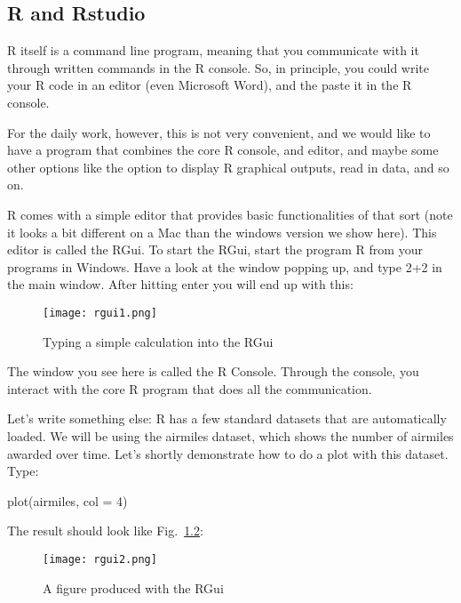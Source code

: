 \documentclass[a4paper,twoside]{tufte-book}\usepackage[]{graphicx}\usepackage[]{color}
\begin{document}
\begin{appendices}

\chapter{R and Rstudio}

R itself is a command line program, meaning that you communicate with it through written commands in the R console. So, in principle, you could write your R code in an editor (even Microsoft Word), and the paste it in the R console. 

For the daily work, however, this is not very convenient, and we would like to have a program that combines the core R console, and editor, and maybe some other options like the option to display R graphical outputs, read in data, and so on. 

R comes with a simple editor that provides basic functionalities of that sort (note it looks a bit different on a Mac than the windows version we show here). This editor is called the RGui. To start the RGui, start the program R from your programs in Windows. Have a look at the window popping up, and type 2+2 in the main window. After hitting enter you will end up with this:

\begin{figure}[]
\begin{center}
\texttt{[image: rgui1.png]}
\caption{Typing a simple calculation into the RGui}
\label{fig: Rgui1}
\end{center}
\end{figure}


The window you see here is called the R Console. Through the console, you interact with the core R program that does all the communication. 

Let's write something else: R has a few standard datasets that are automatically loaded. We will be using the airmiles dataset, which shows the number of airmiles awarded over time. Let's shortly demonstrate how to do a plot with this dataset. Type:

\begin{Schunk}
\begin{Sinput}
plot(airmiles, col = 4)
\end{Sinput}
\end{Schunk}

The result should look like Fig.~\ref{fig: Rgui2}:

\begin{figure}[]
\begin{center}
\texttt{[image: rgui2.png]}
\caption{A figure produced with the RGui}
\label{fig: Rgui2}
\end{center}
\end{figure}


\end{appendices}
\end{document}
